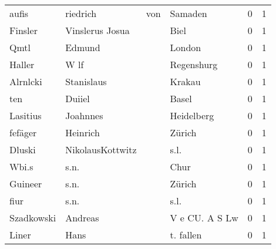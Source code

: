 \begin{center}
\begin{tiny}
\begin{longtabu}{llllrr}
                    aufis &                           riedrich &         von &                                     Samaden &          0 &         1 \\
                  Finsler &                    Vinslerus Josua &             &                                        Biel &          0 &         1 \\
                     Qmtl &                             Edmund &             &                                      London &          0 &         1 \\
                   Haller &                               W lf &             &                                  Regenshurg &          0 &         1 \\
                 Alrnlcki &                         Stanislaus &             &                                      Krakau &          0 &         1 \\
                      ten &                             Duiiel &             &                                       Basel &          0 &         1 \\
                 Lasitius &                           Joahnnes &             &                                  Heidelberg &          0 &         1 \\
                  fefäger &                           Heinrich &             &                                      Zürich &          0 &         1 \\
                   Dluski &                   NikolausKottwitz &             &                                        s.l. &          0 &         1 \\
                    Wbi.s &                               s.n. &             &                                        Chur &          0 &         1 \\
                  Guineer &                               s.n. &             &                                      Zürich &          0 &         1 \\
                     fiur &                               s.n. &             &                                        s.l. &          0 &         1 \\
               Szadkowski &                            Andreas &             &                              V e CU. A S Lw &          0 &         1 \\
                    Liner &                               Hans &             &                                   t. fallen &          0 &         1 \\

\end{longtabu}
\end{tiny}
\end{center}
